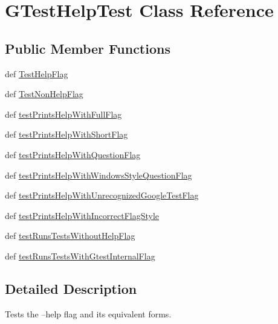 \hypertarget{classgtest__help__test_1_1GTestHelpTest}{\section{\-G\-Test\-Help\-Test \-Class \-Reference}
\label{dd/da9/classgtest__help__test_1_1GTestHelpTest}
}
\subsection*{\-Public \-Member \-Functions}
\begin{DoxyCompactItemize}
\item 
def \hyperlink{classgtest__help__test_1_1GTestHelpTest_a03e87eebc39e569017484cd05fe252bf}{\-Test\-Help\-Flag}
\item 
def \hyperlink{classgtest__help__test_1_1GTestHelpTest_ab9d0587c5e45d5df173827096723c192}{\-Test\-Non\-Help\-Flag}
\item 
def \hyperlink{classgtest__help__test_1_1GTestHelpTest_afb52db7d5401acc46f6b182dbba2e759}{test\-Prints\-Help\-With\-Full\-Flag}
\item 
def \hyperlink{classgtest__help__test_1_1GTestHelpTest_a86344f7c6c3788a0f7bca932db672c54}{test\-Prints\-Help\-With\-Short\-Flag}
\item 
def \hyperlink{classgtest__help__test_1_1GTestHelpTest_a30847ff0696c787f3e7b8c18b1a5911f}{test\-Prints\-Help\-With\-Question\-Flag}
\item 
def \hyperlink{classgtest__help__test_1_1GTestHelpTest_a60f258020cf217001701fd677375635d}{test\-Prints\-Help\-With\-Windows\-Style\-Question\-Flag}
\item 
def \hyperlink{classgtest__help__test_1_1GTestHelpTest_aadaa0acca8e5322ce25a031a7e3ae4c9}{test\-Prints\-Help\-With\-Unrecognized\-Google\-Test\-Flag}
\item 
def \hyperlink{classgtest__help__test_1_1GTestHelpTest_a1e45a8e47d4c8e2ab01f47fafcfb5922}{test\-Prints\-Help\-With\-Incorrect\-Flag\-Style}
\item 
def \hyperlink{classgtest__help__test_1_1GTestHelpTest_a1650e6efdcd2340224d7de713160e49d}{test\-Runs\-Tests\-Without\-Help\-Flag}
\item 
def \hyperlink{classgtest__help__test_1_1GTestHelpTest_a4cf9a2c7acfa303f0e209dc9151da845}{test\-Runs\-Tests\-With\-Gtest\-Internal\-Flag}
\end{DoxyCompactItemize}


\subsection{\-Detailed \-Description}
\begin{DoxyVerb}Tests the --help flag and its equivalent forms.\end{DoxyVerb}
 

